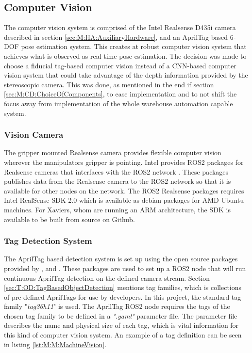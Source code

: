 \subsection{Computer Vision} \label{sec:M:PAP:MachineVision}
The computer vision system is comprised of the Intel Realsense D435i camera described in section \ref{sec:M:HA:AuxiliaryHardware}, and an AprilTag based 6-DOF pose estimation system. This creates at robust computer vision system that achieves what is observed as real-time pose estimation. The decision was made to choose a fiducial tag-based computer vision instead of a CNN-based computer vision system that could take advantage of the depth information provided by the stereoscopic camera. This was done, as mentioned in the end if section \ref{sec:M:CD:ChoiceOfComponents}, to ease implementation and to not shift the focus away from implementation of the whole warehouse automation capable system.

\FloatBarrier
\subsubsection{Vision Camera} 
The gripper mounted Realsense camera provides flexible computer vision wherever the manipulators gripper is pointing. Intel provides ROS2 packages for Realsense cameras that interfaces with the ROS2 network \cite{realsense_ros_repo}. These packages publishes data from the Realsense camera to the ROS2 network so that it is available for other nodes on the network. The ROS2 Realsense packages requires Intel RealSense SDK 2.0 which is available as debian packages for AMD Ubuntu machines. For Xaviers, whom are running an ARM architecture, the SDK is available to be built from source on Github\cite{realsense_jetson_guide}.

\FloatBarrier
\subsubsection{Tag Detection System} \label{sec:M:MRC:MV:TagDetectionSystem}
The AprilTag based detection system is set up using the open source packages provided by \cite{apriltag_repo}, \cite{apriltag_ros_repo} and \cite{apriltag_msgs_repo}. These packages are used to set up a ROS2 node that will run continuous AprilTag detection on the defined camera stream. Section \ref{sec:T:OD:TagBasedObjectDetection} mentions tag families, which is collections of pre-defined AprilTags for use by developers. In this project, the standard tag family "\textit{tag36h11}" is used. The AprilTag ROS2 node requires the tags of the chosen tag family to be defined in a \textit{".yaml"} parameter file. The parameter file describes the name and physical size of each tag, which is vital information for this kind of computer vision system. An example of a tag definition can be seen in listing \ref{lst:M:M:MachineVision}.

